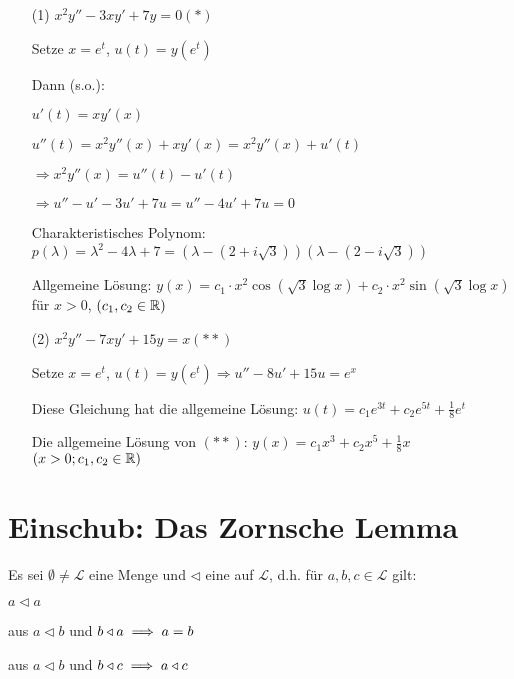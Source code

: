 \documentclass[a4paper,twoside,DIV15,BCOR12mm]{scrbook}
\begin{document}
\begin{beispiel}
	
\begin{itemize}
	\item [(1)] $x^2 y'' - 3 x y' + 7y = 0 (*)$
	
	Setze $x = e^t$, $u(t) = y(e^t)$
	
	Dann (s.o.):
	
	$u'(t) = x y'(x)$
	
	$u''(t) = x^2 y''(x) + xy'(x) = x^2y''(x) + u'(t)$
	
	$\Rightarrow x^2y''(x) = u''(t) - u'(t)$
	
	$\Rightarrow u'' - u' - 3u' + 7u = u'' - 4u' + 7u = 0$
	
	Charakteristisches Polynom: $p(\lambda) = \lambda^2 - 4 \lambda + 7 = (\lambda-(2+i\sqrt{3}))(\lambda - (2-i\sqrt{3}))$
	
	Allgemeine Lösung: $y(x) = c_1 \cdot x^2 \cos(\sqrt{3} \log x) + c_2 \cdot x^2 \sin (\sqrt{3} \log x)$ für $x > 0$, $(c_1, c_2 \in \mathbb{R})$
	
	\item[(2)] $x^2 y'' - 7x y' + 15 y = x (**)$
	
	Setze $x = e^t$, $u(t) = y(e^t) \Rightarrow u'' - 8u' + 15 u = e^x$
	
	Diese Gleichung hat die allgemeine Lösung: $u(t) = c_1 e^{3t} + c_2 e^{5t} + \frac{1}{8}e^t$
	
	Die allgemeine Lösung von $(**)$: $y(x) = c_1 x^3 + c_2 x^5 + \frac{1}{8} x$ $(x > 0; c_1, c_2 \in \mathbb{R})$
\end{itemize}
\end{beispiel}

\chapter{Einschub: Das Zornsche Lemma}

Es sei $\emptyset \neq \mathcal{L}$ eine Menge und $\triangleleft$ eine  auf $\mathcal{L}$, d.h. für $a, b, c \in \mathcal{L}$ gilt:
\begin{liste}
\item $a \triangleleft a$ \\
\item aus $a \triangleleft b$ und $b \triangleleft a \implies a = b$ \\
\item aus $a \triangleleft b$ und $b \triangleleft c \implies a \triangleleft c$ \\
\end{liste}
\end{document}

